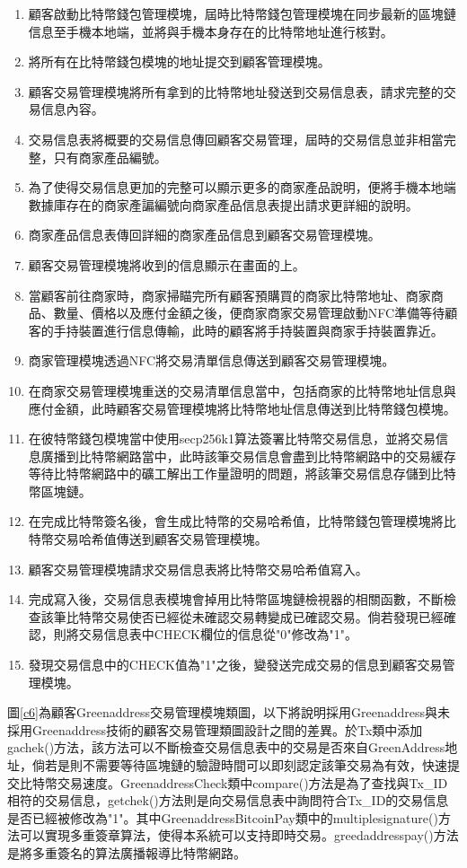 	\begin{enumerate}
		\item 顧客啟動比特幣錢包管理模塊，屆時比特幣錢包管理模塊在同步最新的區塊鏈信息至手機本地端，並將與手機本身存在的比特幣地址進行核對。
		\item 將所有在比特幣錢包模塊的地址提交到顧客管理模塊。
		\item 顧客交易管理模塊將所有拿到的比特幣地址發送到交易信息表，請求完整的交易信息內容。
		\item 交易信息表將概要的交易信息傳回顧客交易管理，屆時的交易信息並非相當完整，只有商家產品編號。
		\item 為了使得交易信息更加的完整可以顯示更多的商家產品說明，便將手機本地端數據庫存在的商家產諞編號向商家產品信息表提出請求更詳細的說明。
		\item 商家產品信息表傳回詳細的商家產品信息到顧客交易管理模塊。
		\item 顧客交易管理模塊將收到的信息顯示在畫面的上。
		\item 當顧客前往商家時，商家掃瞄完所有顧客預購買的商家比特幣地址、商家商品、數量、價格以及應付金額之後，便商家商家交易管理啟動NFC準備等待顧客的手持裝置進行信息傳輸，此時的顧客將手持裝置與商家手持裝置靠近。
		\item 商家管理模塊透過NFC將交易清單信息傳送到顧客交易管理模塊。
		\item 在商家交易管理模塊重送的交易清單信息當中，包括商家的比特幣地址信息與應付金額，此時顧客交易管理模塊將比特幣地址信息傳送到比特幣錢包模塊。
		\item 在彼特幣錢包模塊當中使用secp256k1算法簽署比特幣交易信息，並將交易信息廣播到比特幣網路當中，此時該筆交易信息會盡到比特幣網路中的交易緩存等待比特幣網路中的礦工解出工作量證明的問題，將該筆交易信息存儲到比特幣區塊鏈。
		\item 在完成比特幣簽名後，會生成比特幣的交易哈希值，比特幣錢包管理模塊將比特幣交易哈希值傳送到顧客交易管理模塊。
		\item 顧客交易管理模塊請求交易信息表將比特幣交易哈希值寫入。
		\item 完成寫入後，交易信息表模塊會掉用比特幣區塊鏈檢視器的相關函數，不斷檢查該筆比特幣交易使否已經從未確認交易轉變成已確認交易。倘若發現已經確認，則將交易信息表中CHECK欄位的信息從"0"修改為"1"。
		\item 發現交易信息中的CHECK值為"1"之後，變發送完成交易的信息到顧客交易管理模塊。
	\end{enumerate}

	圖\ref{c6}為顧客Greenaddress交易管理模塊類圖，以下將說明採用Greenaddress與未採用Greenaddress技術的顧客交易管理類圖設計之間的差異。於Tx類中添加gachek()方法，該方法可以不斷檢查交易信息表中的交易是否來自GreenAddress地址，倘若是則不需要等待區塊鏈的驗證時間可以即刻認定該筆交易為有效，快速提交比特幣交易速度。GreenaddressCheck類中compare()方法是為了查找與Tx\_ID相符的交易信息，getchek()方法則是向交易信息表中詢問符合Tx\_ID的交易信息是否已經被修改為"1"。其中GreenaddressBitcoinPay類中的multiplesignature()方法可以實現多重簽章算法，使得本系統可以支持即時交易。greedaddresspay()方法是將多重簽名的算法廣播報導比特幣網路。


